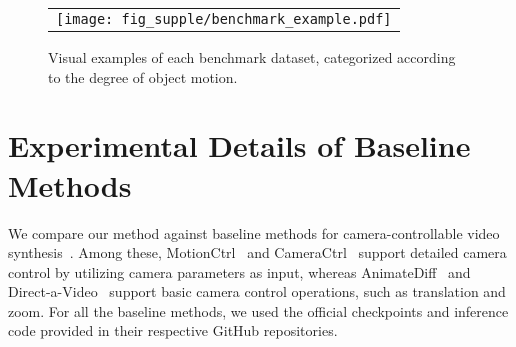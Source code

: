 

\begin{figure}[!t]
\centering
\begin{tabular}{@{}c}
\texttt{[image: fig\_supple/benchmark\_example.pdf]} \\
\end{tabular}
\vspace{-3mm}
\caption{
Visual examples of each benchmark dataset, categorized according to the degree of object motion.
}
\vspace{-3mm}
\label{fig:benchmark_example}
\end{figure}



\section{Experimental Details of Baseline Methods}
We compare our method against baseline methods for camera-controllable video synthesis~\cite{wang2024motionctrl, he2024cameractrl, guo2023animatediff, yang2024direct}.
Among these, MotionCtrl~\cite{wang2024motionctrl} and CameraCtrl~\cite{he2024cameractrl} support detailed camera control by utilizing camera parameters as input, whereas AnimateDiff~\cite{guo2023animatediff} and Direct-a-Video~\cite{yang2024direct} support basic camera control operations, such as translation and zoom.
For all the baseline methods, we used the official checkpoints and inference code provided in their respective GitHub repositories.

